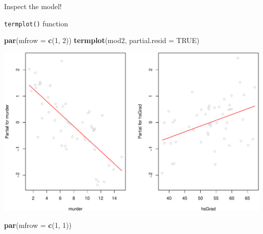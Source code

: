 \documentclass[ignorenonframetext,]{beamer}
\newenvironment{Shaded}{\begin{snugshade}}{\end{snugshade}}
\newcommand{\KeywordTok}[1]{\textcolor[rgb]{0.13,0.29,0.53}{\textbf{{#1}}}}
\newcommand{\DataTypeTok}[1]{\textcolor[rgb]{0.13,0.29,0.53}{{#1}}}
\newcommand{\DecValTok}[1]{\textcolor[rgb]{0.00,0.00,0.81}{{#1}}}
\newcommand{\OtherTok}[1]{\textcolor[rgb]{0.56,0.35,0.01}{{#1}}}
\newcommand{\NormalTok}[1]{{#1}}
\begin{document}
\begin{frame}[fragile]{Inspect the model!}

\begin{block}{\texttt{termplot()} function}

\begin{Shaded}
\begin{Highlighting}[]
\KeywordTok{par}\NormalTok{(}\DataTypeTok{mfrow =} \KeywordTok{c}\NormalTok{(}\DecValTok{1}\NormalTok{, }\DecValTok{2}\NormalTok{))}
\KeywordTok{termplot}\NormalTok{(mod2, }\DataTypeTok{partial.resid =} \OtherTok{TRUE}\NormalTok{)}
\end{Highlighting}
\end{Shaded}

\includegraphics{Regression_files/figure-beamer/unnamed-chunk-17-1.pdf}

\begin{Shaded}
\begin{Highlighting}[]
\KeywordTok{par}\NormalTok{(}\DataTypeTok{mfrow =} \KeywordTok{c}\NormalTok{(}\DecValTok{1}\NormalTok{, }\DecValTok{1}\NormalTok{))}
\end{Highlighting}
\end{Shaded}

\end{block}

\end{frame}
\end{document}
